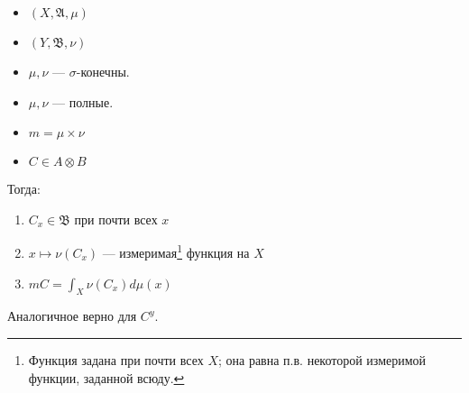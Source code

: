 \begin{theorem}\itemfix
    \label{принцип Кавальери}
    \begin{itemize}
        \item \((X, \mathfrak{A}, \mu)\)
        \item \((Y, \mathfrak{B}, \nu)\)
        \item \(\mu, \nu\) --- \(\sigma\)-конечны.
        \item \(\mu, \nu\) --- полные.
        \item \(m = \mu \times \nu\)
        \item \(C \in A \otimes B\)
    \end{itemize}

    Тогда:
    \begin{enumerate}
        \item \(C_x \in \mathfrak{B}\) при почти всех \(x\)
        \item \(x \mapsto \nu(C_x)\) --- измеримая\footnote{Функция задана при почти всех \(X\); она равна п.в. некоторой измеримой функции, заданной всюду.} функция на \(X\)
        \item \(mC = \int_X \nu(C_x) d \mu(x)\)
    \end{enumerate}

    Аналогичное верно для \(C^y\).
\end{theorem}

\begin{example}
    \? %
\end{example}

